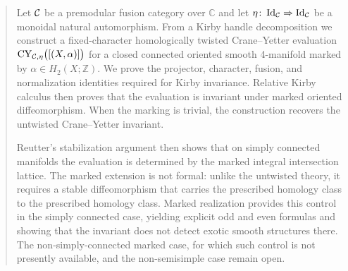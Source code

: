 \begin{abstract}
Let $\cC$ be a premodular fusion category over $\mathbb{C}$ and let
$\eta\colon\operatorname{Id}_{\cC}\Rightarrow\operatorname{Id}_{\cC}$ be a
monoidal natural automorphism.  From a Kirby handle decomposition we construct a
fixed-character homologically twisted Crane--Yetter evaluation
$\CY_{\cC,\eta}\bigl([(X,\alpha)]\bigr)$ for a closed connected oriented smooth
4-manifold marked by $\alpha\in H_2(X;\mathbb{Z})$.  We prove the
projector, character, fusion, and normalization identities required for
Kirby invariance.  Relative Kirby calculus then proves that the evaluation is
invariant under marked oriented diffeomorphism.  When the marking is trivial,
the construction recovers the untwisted Crane--Yetter invariant.

Reutter's stabilization argument \cite{Reutter2023} then shows that on simply
connected manifolds the
evaluation is determined by the marked integral intersection lattice.  The
marked extension is not formal: unlike the
untwisted theory, it requires a stable diffeomorphism that carries the
prescribed homology class to the prescribed homology class.  Marked realization
provides this control in the simply connected case, yielding explicit odd and
even formulas and showing that the invariant does not detect exotic smooth
structures there.  The non-simply-connected marked case, for which such control
is not presently available, and the non-semisimple case remain open.
\end{abstract}
